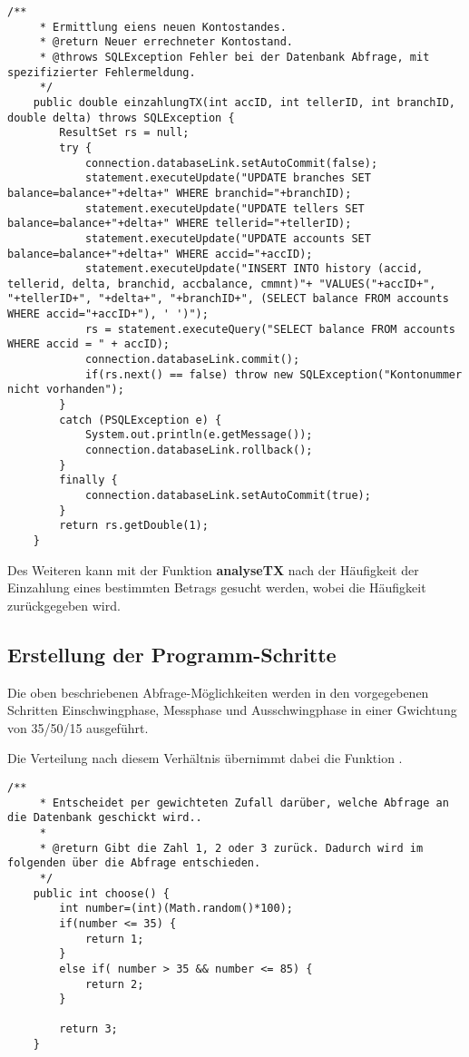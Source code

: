 \begin{lstlisting}[caption={einzahlungsTX-Funktion in TXHandler.java}]
	/**
	 * Ermittlung eiens neuen Kontostandes.
	 * @return Neuer errechneter Kontostand.
	 * @throws SQLException Fehler bei der Datenbank Abfrage, mit spezifizierter Fehlermeldung.
	 */
	public double einzahlungTX(int accID, int tellerID, int branchID, double delta) throws SQLException	{
		ResultSet rs = null;
		try {
			connection.databaseLink.setAutoCommit(false);
			statement.executeUpdate("UPDATE branches SET balance=balance+"+delta+" WHERE branchid="+branchID);
			statement.executeUpdate("UPDATE tellers SET balance=balance+"+delta+" WHERE tellerid="+tellerID);
			statement.executeUpdate("UPDATE accounts SET balance=balance+"+delta+" WHERE accid="+accID);
			statement.executeUpdate("INSERT INTO history (accid, tellerid, delta, branchid, accbalance, cmmnt)"+ "VALUES("+accID+", "+tellerID+", "+delta+", "+branchID+", (SELECT balance FROM accounts WHERE accid="+accID+"), ' ')");
			rs = statement.executeQuery("SELECT balance FROM accounts WHERE accid = " + accID);
			connection.databaseLink.commit();
			if(rs.next() == false) throw new SQLException("Kontonummer nicht vorhanden");
		}
		catch (PSQLException e) {
			System.out.println(e.getMessage());
			connection.databaseLink.rollback();
		}
		finally {
			connection.databaseLink.setAutoCommit(true);
		}
		return rs.getDouble(1);
	}
\end{lstlisting}


Des Weiteren kann mit der Funktion \textbf{analyseTX} nach der Häufigkeit der
Einzahlung eines bestimmten Betrags gesucht werden, wobei die Häufigkeit zurückgegeben wird.

\subsection{Erstellung der Programm-Schritte}
Die oben beschriebenen Abfrage-Möglichkeiten werden in den vorgegebenen
Schritten Einschwingphase, Messphase und Ausschwingphase in einer Gwichtung von
35/50/15 ausgeführt.

Die Verteilung nach diesem Verhältnis übernimmt dabei die Funktion
.

\begin{lstlisting}[caption={choose-Funktion in ProgramStage.java}]
	/**
	 * Entscheidet per gewichteten Zufall darüber, welche Abfrage an die Datenbank geschickt wird..
	 * 
	 * @return Gibt die Zahl 1, 2 oder 3 zurück. Dadurch wird im folgenden über die Abfrage entschieden.
	 */
	public int choose() {
		int number=(int)(Math.random()*100);
		if(number <= 35) {
			return 1;
		}
		else if( number > 35 && number <= 85) {
			return 2;
		}
		
		return 3;
	}
\end{lstlisting}


